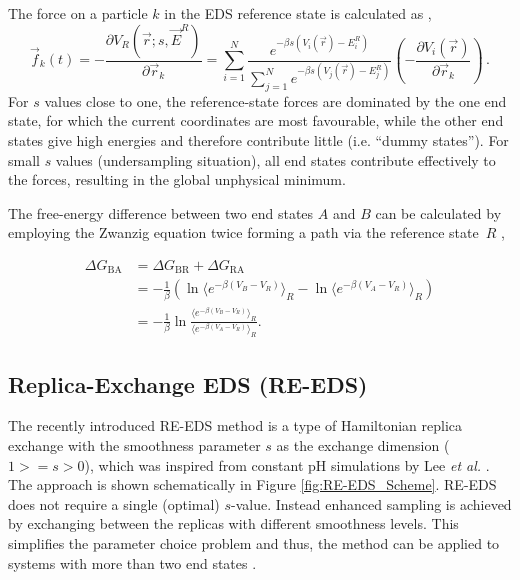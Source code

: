 The force on a particle $k$ in the EDS reference state is calculated as \cite{Christ2008},
\begin{equation}
\vec{f}_k(t)=-\frac{\partial V_R(\vec{r}; s, \vec{E}^R)}{\partial \vec{r}_k} = \sum^N_{i=1}\frac{e^{-\beta s(V_i(\vec{r}) -E_i^R)}}{\sum^N_{j=1}{e^{-\beta s (V_j(\vec{r})-E_j^R)}}}  \left( -\frac{\partial V_i(\vec{r})}{\partial \vec{r}_k} \right) \,.
\label{eq:laws_of_motion}
\end{equation}
%
For $s$ values close to one, the reference-state forces are dominated by the one end state, for which the current coordinates are most favourable, while the other end states give high energies and therefore contribute little (i.e. ``dummy states'').  
For small $s$ values (undersampling situation), all end states contribute effectively to the forces, resulting in the global unphysical minimum.

The free-energy difference between two end states $A$ and $B$ can be calculated by employing the Zwanzig equation twice forming a path via the reference state~$R$ \cite{Zwanzig1954,Christ2007,Christ2008},

\begin{align} \nonumber
	\Delta G_{\text{BA}} &=  \Delta G_{\text{BR}} + \Delta G_{\text{RA}} \\ 
	&=-\frac{1}{\beta}\left(\ln \langle e^{-\beta (V_B-V_R)}\rangle_R - \ln \langle e^{-\beta (V_A-V_R )}\rangle_R\right) \\ 
	&= -\frac{1}{\beta} \ln \frac{\langle e^{-\beta (V_B-V_R)}\rangle_R}{\langle e^{-\beta (V_A-V_R)}\rangle_R}.
	\label{EQ: Free Energy calculation via reference state}
\end{align}


\subsection{Replica-Exchange EDS (RE-EDS)}
The recently introduced RE-EDS method \cite{Sidler2016,Sidler2017} is a type of Hamiltonian replica exchange \cite{Hansmann1997,Sugita2000} with the smoothness parameter $s$ as the exchange dimension ($1>=s>0$), which was inspired from constant pH simulations by Lee \textit{et al.} \cite{Lee2014,Lee2015}. The approach is shown schematically in Figure \ref{fig:RE-EDS_Scheme}.
RE-EDS does not require a single (optimal) $s$-value. Instead enhanced sampling is achieved by exchanging between the replicas with different smoothness levels. This simplifies the parameter choice problem and thus, the method can be applied to systems with more than two end states \cite{Sidler2016,Sidler2017}.

